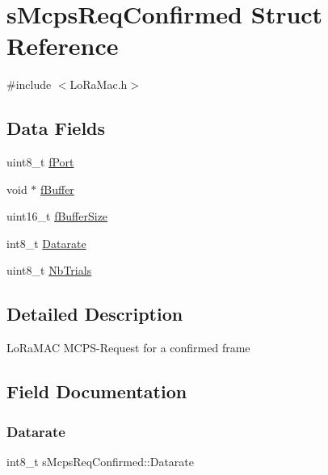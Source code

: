 \hypertarget{structsMcpsReqConfirmed}{}\section{s\+Mcps\+Req\+Confirmed Struct Reference}
\label{structsMcpsReqConfirmed}


{\ttfamily \#include $<$Lo\+Ra\+Mac.\+h$>$}

\subsection*{Data Fields}
\begin{DoxyCompactItemize}
\item 
uint8\+\_\+t \hyperlink{structsMcpsReqConfirmed_a36b8d158ec49602e067d7884d39f94e7}{f\+Port}
\item 
void $\ast$ \hyperlink{structsMcpsReqConfirmed_a052ecff6388f3ee4d02be3fc3bf40570}{f\+Buffer}
\item 
uint16\+\_\+t \hyperlink{structsMcpsReqConfirmed_a47f46ba0eb6fe45951fadbb43687a9fd}{f\+Buffer\+Size}
\item 
int8\+\_\+t \hyperlink{structsMcpsReqConfirmed_afbd019ef536a8fe3c418bb362378c9cf}{Datarate}
\item 
uint8\+\_\+t \hyperlink{structsMcpsReqConfirmed_a4bf78c5cc4e56c815c592fcea5b07f82}{Nb\+Trials}
\end{DoxyCompactItemize}


\subsection{Detailed Description}
Lo\+Ra\+M\+AC M\+C\+P\+S-\/\+Request for a confirmed frame 

\subsection{Field Documentation}
\mbox{\label{structsMcpsReqConfirmed_afbd019ef536a8fe3c418bb362378c9cf}} 
\subsubsection{\texorpdfstring{Datarate}{Datarate}}
{\footnotesize\ttfamily int8\+\_\+t s\+Mcps\+Req\+Confirmed\+::\+Datarate}

